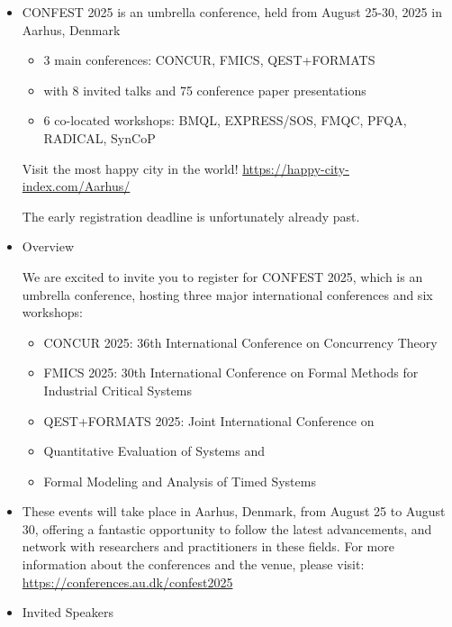 \documentclass[prodmode,acmtecs]{acmsmall} %
\begin{document}
\begin{itemize}\item  CONFEST 2025 is an umbrella conference, held from August 25-30, 2025 in Aarhus, Denmark 
 
\begin{itemize}\item  3 main conferences: CONCUR, FMICS, QEST+FORMATS
\item  with 8 invited talks and 75 conference paper presentations
\item  6 co-located workshops: BMQL, EXPRESS/SOS, FMQC, PFQA, RADICAL, SynCoP
\end{itemize} 
  Visit the most happy city in the world! \href{https://happy-city-index.com/Aarhus/}{https://happy-city-index.com/Aarhus/} 
 
  The early registration deadline is unfortunately already past.  
 
\item  Overview 
 
  We are excited to invite you to register for CONFEST 2025, which is an umbrella conference, hosting three major international conferences and six workshops: 
 
\begin{itemize}\item  CONCUR 2025: 36th International Conference on Concurrency Theory
\item  FMICS 2025: 30th International Conference on Formal Methods for Industrial Critical Systems
\item  QEST+FORMATS 2025: Joint International Conference on
\item  Quantitative Evaluation of Systems and
\item  Formal Modeling and Analysis of Timed Systems
\end{itemize} 
\item  These events will take place in Aarhus, Denmark, from August 25 to August 30, offering a fantastic opportunity to follow the latest advancements, and network with researchers and practitioners in these fields. For more information about the conferences and the venue, please visit: \href{https://conferences.au.dk/confest2025}{https://conferences.au.dk/confest2025} 
 
\item  Invited Speakers 
 

\end{itemize}
\end{document}
